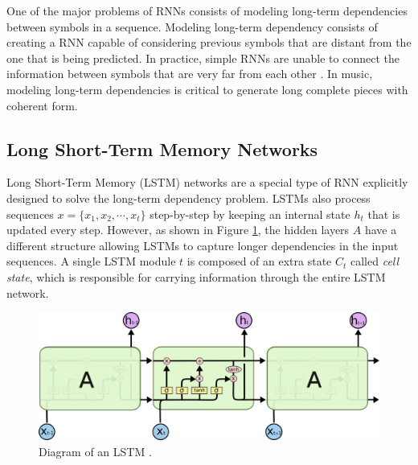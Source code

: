 One of the major problems of RNNs consists of modeling long-term dependencies between symbols in a sequence. Modeling long-term dependency consists of creating a RNN capable of considering previous symbols that are distant from the one that is being predicted. In practice, simple RNNs are unable to connect the information between symbols that are very far from each other \cite{bengio1994}. In music, modeling long-term dependencies is critical to generate long complete pieces with coherent form.

\subsection{Long Short-Term Memory Networks}
\label{sec:lstm}

Long Short-Term Memory (LSTM) networks \cite{hochreiter1997long} are a special type of RNN explicitly designed to solve the long-term dependency problem. LSTMs also process sequences $x = \{x_1, x_2, \cdots, x_t\}$ step-by-step by keeping an internal state $h_t$ that is updated every step. However, as shown in Figure \ref{fig:lstm}, the hidden layers $A$ have a different structure allowing LSTMs to capture longer dependencies in the input sequences.
A single LSTM module $t$ is composed of an extra state $C_t$ called \textit{cell state}, which is responsible for carrying information through the entire LSTM network.

\begin{figure}[!h]
\centering
\includegraphics[width=0.9\columnwidth]{imgs/background/lstm.png}
\caption{Diagram of an LSTM \cite{olah2015understanding}.}
\label{fig:lstm}
\end{figure}

